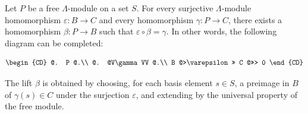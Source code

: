 Let $P$ be a free $\Lambda$-module on a set $S$. For every surjective $\Lambda$-module homomorphism $\varepsilon : B \rightarrow C$ and every homomorphism $\gamma : P \rightarrow C$, there exists a homomorphism $\beta : P \rightarrow B$ such that $\varepsilon \circ \beta = \gamma$. In other words, the following diagram can be completed:

\[
\begin{CD}
@. P @.\\
@. @V\gamma VV @.\\
B @>\varepsilon>> C @>>> 0
\end{CD}
\]

The lift $\beta$ is obtained by choosing, for each basis element $s \in S$, a preimage in $B$ of $\gamma(s) \in C$ under the surjection $\varepsilon$, and extending by the universal property of the free module.
